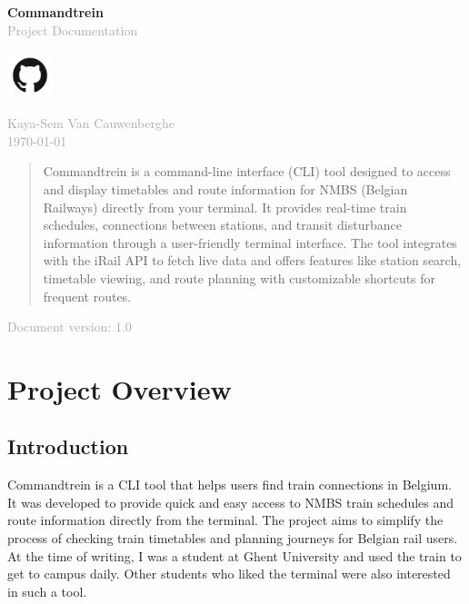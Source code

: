 \documentclass[10pt,a4paper]{article}
\newcommand{\projecttitle}[1]{
    \begin{center}
        {\Huge\bfseries\color{primary} #1}\\
        \vspace{0.5cm}
        \textcolor{darkgray}{\large Project Documentation}
    \end{center}
}
\begin{document}
\begin{titlepage}
	\centering
	\vspace*{2cm}

	\projecttitle{Commandtrein}

	\vspace{1cm}

	\vspace{1cm}
	\begin{center}
		\href{https://github.com/Kaya-Sem/commandtrein}{\includegraphics[width=0.1\textwidth]{../images/github-mark.png}}
	\end{center}

	\vspace{1cm}

	\textcolor{darkgray}{\large Kaya-Sem Van Cauwenberghe}\\
	\textcolor{darkgray}{\today}

	\vfill

	\begin{abstract}
		\noindent
		Commandtrein is a command-line interface (CLI) tool designed to access and display timetables and route information for NMBS (Belgian Railways) directly from your terminal. It provides real-time train schedules, connections between stations, and transit disturbance information through a user-friendly terminal interface. The tool integrates with the iRail API to fetch live data and offers features like station search, timetable viewing, and route planning with customizable shortcuts for frequent routes.
	\end{abstract}

	\vspace{1cm}

	\small
	\textcolor{darkgray}{Document version: 1.0}
\end{titlepage}

\newpage

\section{Project Overview}
\subsection{Introduction}
Commandtrein is a CLI tool that helps users find train connections in Belgium. It was developed to provide quick and easy access to NMBS train schedules and route information directly from the terminal. The project aims to simplify the process of checking train timetables and planning journeys for
Belgian rail users. At the time of writing, I was a student at Ghent University and used the train to get to campus daily. Other students who liked the terminal were also interested in such a tool.
\end{document}
